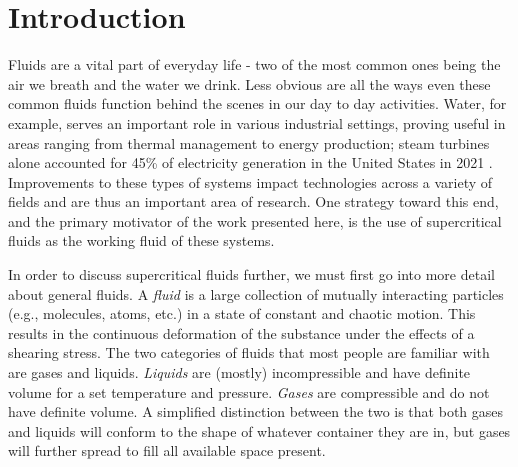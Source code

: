 \chapter{Introduction}

Fluids are a vital part of everyday life - two of the most common ones being the air we breath and the water we drink. Less obvious are all the ways even these common fluids function behind the scenes in our day to day activities. Water, for example, serves an important role in various industrial settings, proving useful in areas ranging from thermal management to energy production; steam turbines alone accounted for 45\% of electricity generation in the United States in 2021 \cite{US_elec_gen_stat}. Improvements to these types of systems impact technologies across a variety of fields and are thus an important area of research. One strategy toward this end, and the primary motivator of the work presented here, is the use of supercritical fluids as the working fluid of these systems. 


In order to discuss supercritical fluids further, we must first go into more detail about general fluids. A \textit{fluid} is a large collection of mutually interacting particles (e.g., molecules, atoms, etc.) in a state of constant and chaotic motion. This results in the continuous deformation of the substance under the effects of a shearing stress. The two categories of fluids that most people are familiar with are gases and liquids. \textit{Liquids} are (mostly) incompressible and have definite volume for a set temperature and pressure. \textit{Gases} are compressible and do not have definite volume. A simplified distinction between the two is that both gases and liquids will conform to the shape of whatever container they are in, but gases will further spread to fill all available space present. 

%
%

